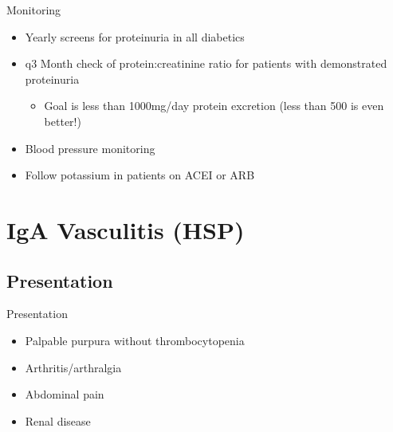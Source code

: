 \begin{frame}{Monitoring}

\begin{itemize}
\itemsep1pt\parskip0pt
\item
  Yearly screens for proteinuria in all diabetics
\item
  q3 Month check of protein:creatinine ratio for patients with
  demonstrated proteinuria

  \begin{itemize}
  \itemsep1pt\parskip0pt
  \item
    Goal is less than 1000mg/day protein excretion (less than 500 is
    even better!)
  \end{itemize}
\item
  Blood pressure monitoring
\item
  Follow potassium in patients on ACEI or ARB
\end{itemize}

\end{frame}

\section{IgA Vasculitis (HSP)}\label{iga-vasculitis-hsp}

\frame{\tableofcontents[hideothersubsections]}

\subsection{Presentation}\label{presentation}

\begin{frame}{Presentation}

\begin{itemize}
\itemsep1pt\parskip0pt
\item
  Palpable purpura without thrombocytopenia
\item
  Arthritis/arthralgia
\item
  Abdominal pain
\item
  Renal disease
\end{itemize}

\end{frame}

